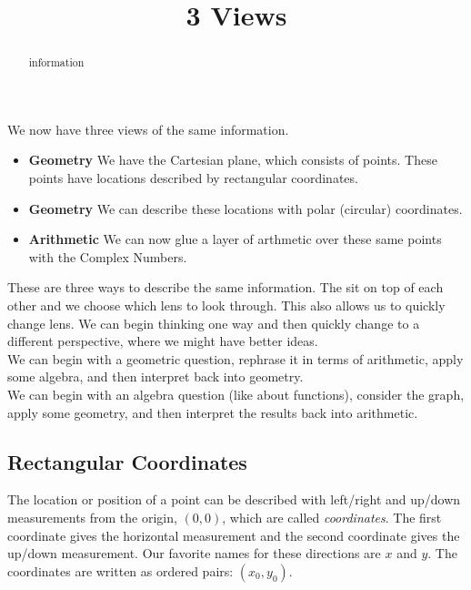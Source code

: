 \documentclass{ximera}
\title{3 Views}
\begin{document}
\begin{abstract}
information
\end{abstract}
\maketitle




We now have three views of the same information.



\begin{itemize}
\item \textbf{\textcolor{purple!85!blue}{Geometry}} We have the Cartesian plane, which consists of points.  These points have locations described by rectangular coordinates. \\

\item \textbf{\textcolor{purple!85!blue}{Geometry}} We can describe these locations with polar (circular) coordinates. \\

\item \textbf{\textcolor{purple!85!blue}{Arithmetic}} We can now glue a layer of arthmetic over these same points with the Complex Numbers.
\end{itemize}


These are three ways to describe the same information.  The sit on top of each other and we choose which lens to look through.  This also allows us to quickly change lens.  We can begin thinking one way and then quickly change to a different perspective, where we might have better ideas. \\

We can begin with a geometric question, rephrase it in terms of arithmetic, apply some algebra, and then interpret back into geometry. \\

We can begin with an algebra question (like about functions), consider the graph, apply some geometry, and then interpret the results back into arithmetic.  \\




\subsection*{Rectangular Coordinates}

The location or position of a point can be described with left/right and up/down measurements from the origin, $(0,0)$, which are called \textit{coordinates}.  The first coordinate gives the horizontal measurement and the second coordinate gives the up/down measurement.  Our favorite names for these directions are $x$ and $y$. The coordinates are written as ordered pairs: $(x_0, y_0)$.
\end{document}
